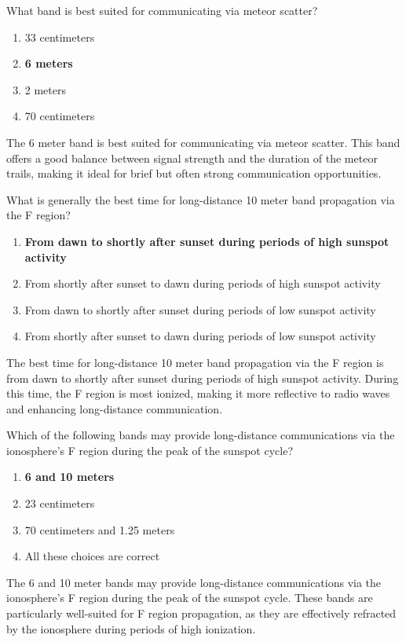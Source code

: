 \begin{tcolorbox}[colback=gray!10!white,colframe=black!75!black,title={T3C07}]
    What band is best suited for communicating via meteor scatter?
    \begin{enumerate}[label=\Alph*),noitemsep]
        \item 33 centimeters
        \item \textbf{6 meters}
        \item 2 meters
        \item 70 centimeters
    \end{enumerate}
\end{tcolorbox}
The 6 meter band is best suited for communicating via meteor scatter. This band offers a good balance between signal strength and the duration of the meteor trails, making it ideal for brief but often strong communication opportunities.

\begin{tcolorbox}[colback=gray!10!white,colframe=black!75!black,title={T3C09}]
    What is generally the best time for long-distance 10 meter band propagation via the F region?
    \begin{enumerate}[label=\Alph*),noitemsep]
        \item \textbf{From dawn to shortly after sunset during periods of high sunspot activity}
        \item From shortly after sunset to dawn during periods of high sunspot activity
        \item From dawn to shortly after sunset during periods of low sunspot activity
        \item From shortly after sunset to dawn during periods of low sunspot activity
    \end{enumerate}
\end{tcolorbox}
The best time for long-distance 10 meter band propagation via the F region is from dawn to shortly after sunset during periods of high sunspot activity. During this time, the F region is most ionized, making it more reflective to radio waves and enhancing long-distance communication.

\begin{tcolorbox}[colback=gray!10!white,colframe=black!75!black,title={T3C10}]
    Which of the following bands may provide long-distance communications via the ionosphere’s F region during the peak of the sunspot cycle?
    \begin{enumerate}[label=\Alph*),noitemsep]
        \item \textbf{6 and 10 meters}
        \item 23 centimeters
        \item 70 centimeters and 1.25 meters
        \item All these choices are correct
    \end{enumerate}
\end{tcolorbox}
The 6 and 10 meter bands may provide long-distance communications via the ionosphere’s F region during the peak of the sunspot cycle. These bands are particularly well-suited for F region propagation, as they are effectively refracted by the ionosphere during periods of high ionization.

